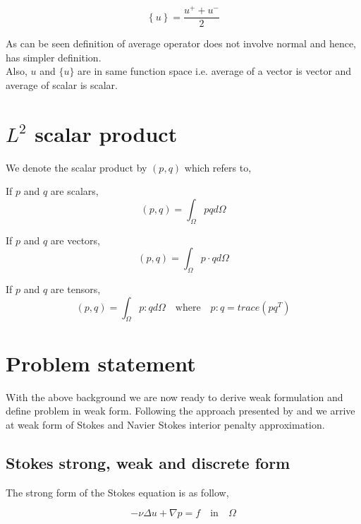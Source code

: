 \documentclass[a4paper,12pt]{book}
\begin{document}
\begin{equation}\label{average operator}
\left\lbrace u \right\rbrace = \frac{u^+ + u^-}{2}  
\end{equation} 


As can be seen definition of average operator does not involve normal and hence, has simpler definition.\\
Also, $u$ and $\lbrace u \rbrace$ are in same function space i.e. average of a vector is vector and average of scalar is scalar.\\

\section{$L^2$ scalar product}

We denote the scalar product by $(p,q)$ which refers to,

If $p$ and $q$ are scalars,
\begin{equation}\label{inner product scalars}
(p,q)=\int_{\Omega} pq d \Omega 
\end{equation}

If $p$ and $q$ are vectors,
\begin{equation}\label{Inner product vectors}
(p,q)=\int_{\Omega} p \cdot q d\Omega
\end{equation}

If $p$ and $q$ are tensors,
\begin{equation}\label{Inner product tensors}
(p,q)=\int_{\Omega} p:q d\Omega \quad \textrm{where} \quad p:q = trace(pq^T)
\end{equation}

\section{Problem statement}

With the above background we are now ready to derive weak formulation and define problem in weak form. Following the approach presented by \cite{Montlaur} and \cite{Montlaur2} we arrive at weak form of Stokes and Navier Stokes interior penalty approximation.

\subsection{Stokes strong, weak and discrete form} \label{Stokes_flow_ch3}

The strong form of the Stokes equation is as follow,

\begin{equation} \label{stokes_strong_form_ch3}
-\nu \Delta u + \nabla p = f \quad \textrm{in} \quad \Omega
\end{equation}
\end{document}
